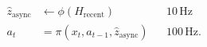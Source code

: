 \documentclass[border=7pt]{standalone}
\begin{document}
\color{ink}
$\displaystyle \begin{aligned}
\hat z_{\mathrm{async}}&\leftarrow\phi(H_{\mathrm{recent}}) &&10\,\mathrm{Hz}\\[4pt]
a_t&=\pi\!\left(x_t,a_{t-1},\hat z_{\mathrm{async}}\right) &&100\,\mathrm{Hz}.
\end{aligned}$
\end{document}
